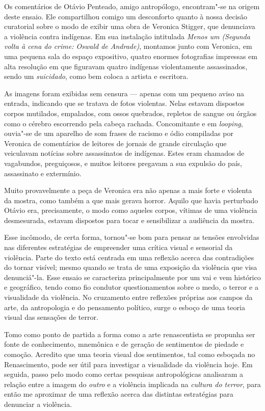 Os comentários de Otávio Penteado, amigo antropólogo, encontram"-se na origem deste ensaio. Ele compartilhou comigo um desconforto quanto à nossa decisão
curatorial sobre o modo de exibir uma obra de Veronica Stigger, que denunciava a violência contra indígenas. Em sua instalação intitulada \emph{Menos um (Segunda
volta à cena do crime: Oswald de Andrade)}, montamos junto com Veronica,
em uma pequena sala do espaço expositivo, quatro enormes fotografias
impressas em alta resolução em que figuravam quatro indígenas
violentamente assassinados, sendo um \emph{suicidado}, como bem coloca a
artista e escritora.

As imagens foram exibidas sem censura --- apenas com um pequeno aviso na
entrada, indicando que se tratava de fotos violentas. Nelas estavam
dispostos corpos mutilados, empalados, com ossos quebrados, repletos de
sangue ou órgãos como o cérebro escorrendo pela cabeça rachada.
Concomitante e em \emph{looping}, ouvia"-se de um aparelho de som frases
de racismo e ódio compiladas por Veronica de comentários de leitores de
jornais de grande circulação que veiculavam notícias sobre assassinatos
de indígenas. Estes eram chamados de vagabundos, preguiçosos, e muitos
leitores pregavam a sua expulsão do país, assassinato e extermínio.

Muito provavelmente a peça de Veronica era não apenas a mais forte e
violenta da mostra, como também a que mais gerava horror. Aquilo que
havia perturbado Otávio era, precisamente, o modo como
aqueles corpos, vítimas de uma violência desmesurada, estavam dispostos
para tocar e sensibilizar a audiência da mostra.

Esse incômodo, de certa forma,
tornou"-se bom para pensar as tensões envolvidas nas diferentes
estratégias de empreender uma crítica visual e sensorial da violência.
Parte do texto está centrada em uma reflexão acerca das contradições do
tornar visível; mesmo quando se trata de uma exposição da violência que
visa denunciá"-la. Esse ensaio se caracteriza principalmente por um vai e
vem histórico e geográfico, tendo como fio condutor questionamentos
sobre o medo, o terror e a visualidade da violência. No cruzamento entre
reflexões próprias aos campos da arte, da antropologia e do pensamento
político, surge o esboço de uma teoria visual das sensações de terror.

Tomo como ponto de partida a forma como a arte renascentista se propunha
ser fonte de conhecimento, mnemônica e de geração de sentimentos de
piedade e comoção. Acredito que uma teoria visual dos sentimentos, tal
como esboçada no Renascimento, pode ser útil para investigar a
visualidade da violência hoje. Em seguida, passo pelo modo como certas
pesquisas antropológicas analisaram a relação entre a imagem do
\emph{outro} e a violência implicada na \emph{cultura do terror}, para
então me aproximar de uma reflexão acerca das distintas estratégias para
denunciar a violência.

